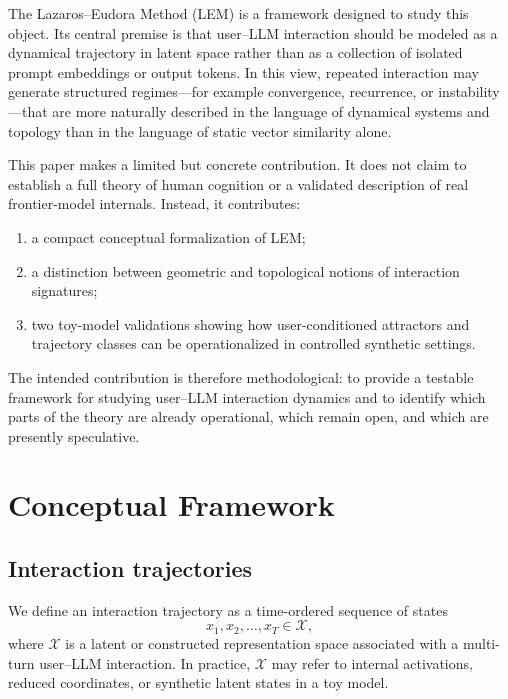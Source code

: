 \documentclass[11pt]{article}
\begin{document}
The Lazaros--Eudora Method (LEM) is a framework designed to
study this object. Its central premise is that user--LLM
interaction should be modeled as a dynamical trajectory in
latent space rather than as a collection of isolated prompt
embeddings or output tokens. In this view, repeated
interaction may generate structured regimes---for example
convergence, recurrence, or instability---that are more
naturally described in the language of dynamical systems and
topology than in the language of static vector similarity
alone.

This paper makes a limited but concrete contribution. It does
not claim to establish a full theory of human cognition or a
validated description of real frontier-model internals.
Instead, it contributes:
\begin{enumerate}[leftmargin=1.5em]
  \item a compact conceptual formalization of LEM;
  \item a distinction between geometric and topological
        notions of interaction signatures;
  \item two toy-model validations showing how
        user-conditioned attractors and trajectory classes
        can be operationalized in controlled synthetic
        settings.
\end{enumerate}

The intended contribution is therefore methodological: to
provide a testable framework for studying user--LLM
interaction dynamics and to identify which parts of the
theory are already operational, which remain open, and which
are presently speculative.


\section{Conceptual Framework}

\subsection{Interaction trajectories}

We define an interaction trajectory as a time-ordered
sequence of states
\[
  x_1, x_2, \dots, x_T \in \mathcal{X},
\]
where $\mathcal{X}$ is a latent or constructed representation
space associated with a multi-turn user--LLM interaction. In
practice, $\mathcal{X}$ may refer to internal activations,
reduced coordinates, or synthetic latent states in a toy
model.
\end{document}
